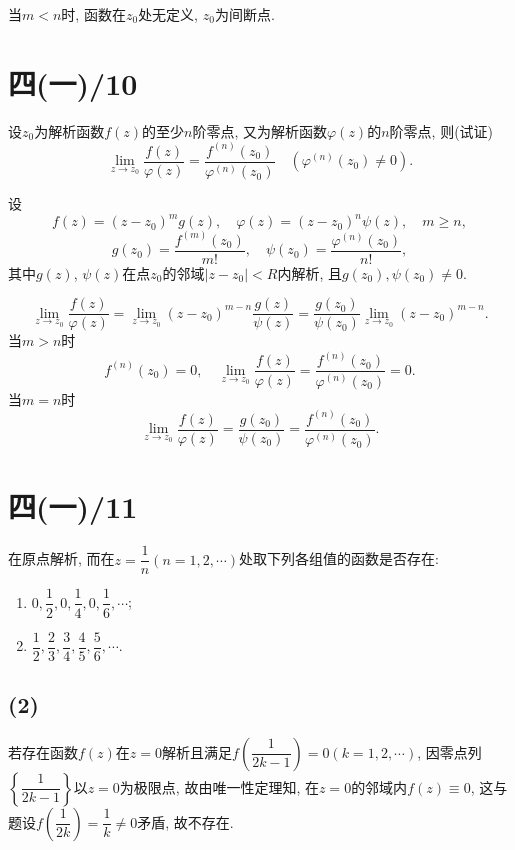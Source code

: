 \documentclass[11pt,a4paper]{article}
\begin{document}
当$m<n$时, 函数在$z_0$处无定义, $z_0$为间断点.

\section{四(一)/10}
\begin{problem}
设$z_0$为解析函数$f(z)$的至少$n$阶零点, 又为解析函数$\varphi(z)$的$n$阶零点, 则(试证)
$$\lim_{z\to z_0}\frac{f(z)}{\varphi(z)}=\frac{f^{(n)}(z_0)}{\varphi^{(n)}(z_0)}\quad(\varphi^{(n)}(z_0)\neq0).$$
\end{problem}

设
$$f(z)=(z-z_0)^mg(z),\quad \varphi(z)=(z-z_0)^n\psi(z),\quad m\geqslant n,$$
$$g(z_0)=\frac{f^{(m)}(z_0)}{m!},\quad \psi(z_0)=\frac{\varphi^{(n)}(z_0)}{n!},$$
其中$g(z)$, $\psi(z)$在点$z_0$的邻域$|z-z_0|<R$内解析, 且$g(z_0),\psi(z_0)\neq0$.

$$\lim_{z\to z_0}\frac{f(z)}{\varphi(z)}=\lim_{z\to z_0}(z-z_0)^{m-n}\frac{g(z)}{\psi(z)}=\frac{g(z_0)}{\psi(z_0)}\lim_{z\to z_0}(z-z_0)^{m-n}.$$
当$m>n$时
$$f^{(n)}(z_0)=0,\quad \lim_{z\to z_0}\frac{f(z)}{\varphi(z)}=\frac{f^{(n)}(z_0)}{\varphi^{(n)}(z_0)}=0.$$
当$m=n$时
$$\lim_{z\to z_0}\frac{f(z)}{\varphi(z)}=\frac{g(z_0)}{\psi(z_0)}=\frac{f^{(n)}(z_0)}{\varphi^{(n)}(z_0)}.$$

\section{四(一)/11}
\begin{problem}
在原点解析, 而在$z=\dfrac{1}{n}(n=1,2,\cdots)$处取下列各组值的函数是否存在:
\begin{enumerate}
  \addtocounter{enumi}{1}
  \item $0,\dfrac{1}{2},0,\dfrac{1}{4},0,\dfrac{1}{6},\cdots$;
        \addtocounter{enumi}{1}
  \item $\dfrac{1}{2},\dfrac{2}{3},\dfrac{3}{4},\dfrac{4}{5},\dfrac{5}{6},\cdots$.
\end{enumerate}
\end{problem}

\subsection*{(2)}
若存在函数$f(z)$在$z=0$解析且满足$f\left(\dfrac{1}{2k-1}\right)=0(k=1,2,\cdots)$, 因零点列$\left\{\dfrac{1}{2k-1}\right\}$以$z=0$为极限点, 故由唯一性定理知, 在$z=0$的邻域内$f(z)\equiv 0$, 这与题设$f\left(\dfrac{1}{2k}\right)=\dfrac{1}{k}\neq 0$矛盾, 故不存在.
\end{document}
